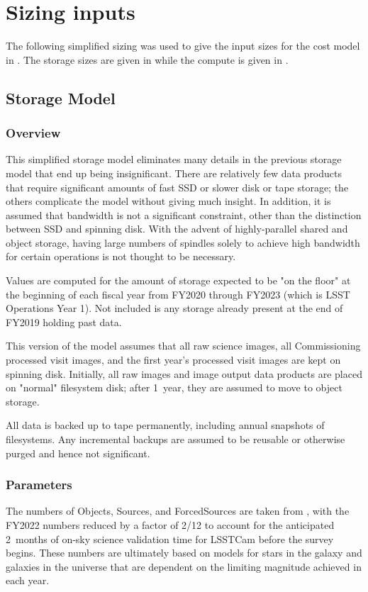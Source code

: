 \section{Sizing inputs}

The following simplified sizing was used to give the input sizes for the cost model in .
The storage sizes are given in  while the compute is given in .

\subsection{Storage Model}



\subsubsection{Overview}
This simplified storage model eliminates many details in the previous storage model  that end up being insignificant.
There are relatively few data products that require significant amounts of fast SSD or slower disk or tape storage; the others complicate the model without giving much insight.
In addition, it is assumed that bandwidth is not a significant constraint, other than the distinction between SSD and spinning disk.  With the advent of highly-parallel shared and object storage, having large numbers of spindles solely to achieve high bandwidth for certain operations is not thought to be necessary.

Values are computed for the amount of storage expected to be "on the floor" at the beginning of each fiscal year from FY2020 through FY2023 (which is LSST Operations Year 1).
Not included is any storage already present at the end of FY2019 holding past data.

This version of the model assumes that all raw science images, all Commissioning processed visit images, and the first year's processed visit images are kept on spinning disk.
Initially, all raw images and image output data products are placed on "normal" filesystem disk; after 1~year, they are assumed to move to object storage.

All data is backed up to tape permanently, including annual snapshots of filesystems.
Any incremental backups are assumed to be reusable or otherwise purged and hence not significant.

\subsubsection{Parameters}
The numbers of Objects, Sources, and ForcedSources are taken from , with the FY2022 numbers reduced by a factor of 2/12 to account for the anticipated 2~months of on-sky science validation time for LSSTCam before the survey begins.
These numbers are ultimately based on models for stars in the galaxy and galaxies in the universe that are dependent on the limiting magnitude achieved in each year.


